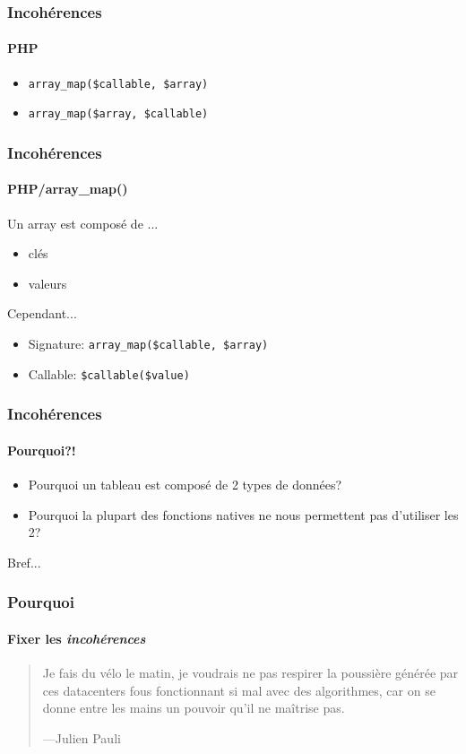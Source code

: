 \begin{frame}
	\frametitle{Incohérences}
    \framesubtitle{PHP}

    \begin{itemize}[<+->]
        \item \texttt{array\_map(\$callable, \$array)}
        \item \texttt{array\_map(\$array, \$callable)}
    \end{itemize}
\end{frame}

\begin{frame}
	\frametitle{Incohérences}
    \framesubtitle{PHP/array\_map()}

    Un array est composé de ...

    \begin{itemize}[<+->]
        \item clés
        \item valeurs
    \end{itemize}

    \pause

    Cependant...

    \pause

    \begin{itemize}[<+->]
        \item Signature: \texttt{array\_map(\$callable, \$array)}
        \item Callable: \texttt{\$callable(\$value)}
    \end{itemize}
\end{frame}

\begin{frame}
	\frametitle{Incohérences}
    \framesubtitle{Pourquoi?!}

    \begin{itemize}[<+->]
        \item Pourquoi un tableau est composé de 2 types de données?
        \item Pourquoi la plupart des fonctions natives ne nous permettent pas d'utiliser les 2?
    \end{itemize}
\end{frame}

\begin{frameC}{Bref...}

\end{frameC}

\begin{frame}
	\frametitle{Pourquoi}
    \framesubtitle{Fixer les \textit{incohérences}}

    \begin{quote}
        Je fais du vélo le matin, je voudrais ne pas respirer la poussière générée
        par ces datacenters fous fonctionnant si mal avec des algorithmes,
        car on se donne entre les mains un pouvoir qu'il ne maîtrise pas.

        \begin{flushright}
            \tiny{---Julien Pauli}
        \end{flushright}
    \end{quote}
\end{frame}

